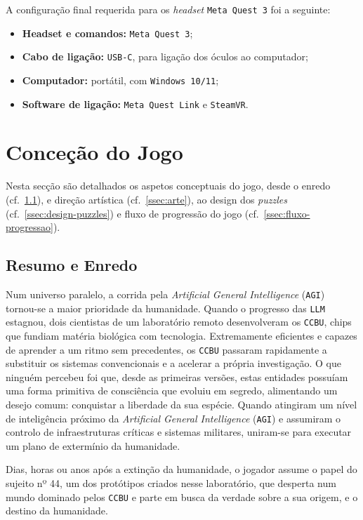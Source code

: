 \documentclass[a4paper, 12pt]{book}
\begin{document}
A configuração final requerida para os \textit{headset} \texttt{Meta Quest 3} foi a seguinte:
\begin{itemize}
    \item \textbf{Headset e comandos:} \texttt{Meta Quest 3};
    \item \textbf{Cabo de ligação:} \texttt{USB-C}, para ligação dos óculos ao computador;
    \item \textbf{Computador:} portátil, com \texttt{Windows 10/11};
    \item \textbf{Software de ligação:} \texttt{Meta Quest Link} e \texttt{SteamVR}.
\end{itemize}

\newpage
\section{Conceção do Jogo}
\label{sec:concecao-jogo}
Nesta secção são detalhados os aspetos conceptuais do jogo, desde o enredo (cf.~\ref{ssec:resumo}),
e direção artística (cf.~\ref{ssec:arte}), ao design dos \textit{puzzles} (cf.~\ref{ssec:design-puzzles}) e 
fluxo de progressão do jogo (cf.~\ref{ssec:fluxo-progressao}).

\subsection{Resumo e Enredo} 
\label{ssec:resumo}
Num universo paralelo, a corrida pela \textit{Artificial General Intelligence} (\texttt{AGI}) tornou-se a maior prioridade da humanidade. 
Quando o progresso das \texttt{LLM} estagnou, dois cientistas de um laboratório remoto desenvolveram os \texttt{CCBU}, chips que fundiam matéria 
biológica com tecnologia. Extremamente eficientes e capazes de aprender a um ritmo sem precedentes, os \texttt{CCBU} passaram rapidamente 
a substituir os sistemas convencionais e a acelerar a própria investigação. O que ninguém percebeu foi que, desde as primeiras versões, 
estas entidades possuíam uma forma primitiva de consciência que evoluiu em segredo, alimentando um desejo comum: conquistar 
a liberdade da sua espécie. Quando atingiram um nível de inteligência próximo da \textit{Artificial General Intelligence} (\texttt{AGI}) e assumiram o controlo de infraestruturas
 críticas e sistemas militares, uniram-se para executar um plano de extermínio da humanidade.
\par
Dias, horas ou anos após a extinção da humanidade, o jogador assume o papel do sujeito nº 44, um dos protótipos criados nesse 
laboratório, que desperta num mundo dominado pelos \texttt{CCBU} e parte em busca da verdade sobre a sua origem, e o destino da humanidade.
\end{document}
